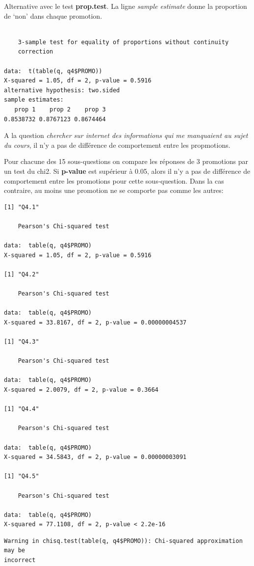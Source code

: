 \documentclass[]{article}
\begin{document}
Alternative avec le test \textbf{prop.test}. La ligne \emph{sample
estimate} donne la proportion de `non' dans chaque promotion.

\begin{verbatim}

    3-sample test for equality of proportions without continuity
    correction

data:  t(table(q, q4$PROMO))
X-squared = 1.05, df = 2, p-value = 0.5916
alternative hypothesis: two.sided
sample estimates:
   prop 1    prop 2    prop 3 
0.8538732 0.8767123 0.8674464 
\end{verbatim}

A la question \emph{chercher sur internet des informations qui me
manquaient au sujet du cours}, il n'y a pas de différence de
comportement entre les propmotions.

Pour chacune des 15 sous-questions on compare les réponses de 3
promotions par un test du chi2. Si \textbf{p-value} est supérieur à
0.05, alors il n'y a pas de différence de comportement entre les
promotions pour cette sous-question. Dans la cas contraire, au moins une
promotion ne se comporte pas comme les autres:

\begin{verbatim}
[1] "Q4.1"

    Pearson's Chi-squared test

data:  table(q, q4$PROMO)
X-squared = 1.05, df = 2, p-value = 0.5916

[1] "Q4.2"

    Pearson's Chi-squared test

data:  table(q, q4$PROMO)
X-squared = 33.8167, df = 2, p-value = 0.00000004537

[1] "Q4.3"

    Pearson's Chi-squared test

data:  table(q, q4$PROMO)
X-squared = 2.0079, df = 2, p-value = 0.3664

[1] "Q4.4"

    Pearson's Chi-squared test

data:  table(q, q4$PROMO)
X-squared = 34.5843, df = 2, p-value = 0.00000003091

[1] "Q4.5"

    Pearson's Chi-squared test

data:  table(q, q4$PROMO)
X-squared = 77.1108, df = 2, p-value < 2.2e-16
\end{verbatim}

\begin{verbatim}
Warning in chisq.test(table(q, q4$PROMO)): Chi-squared approximation may be
incorrect
\end{verbatim}
\end{document}
